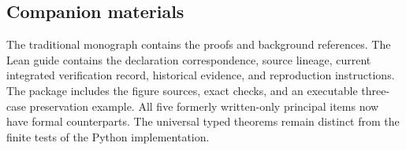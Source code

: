 \documentclass[11pt]{article}
\begin{document}
\subsection*{Companion materials}
The traditional monograph contains the proofs and background references. The Lean guide contains the declaration correspondence, source lineage, current integrated verification record, historical evidence, and reproduction instructions. The package includes the figure sources, exact checks, and an executable three-case preservation example. All five formerly written-only principal items now have formal counterparts. The universal typed theorems remain distinct from the finite tests of the Python implementation.
\end{document}
